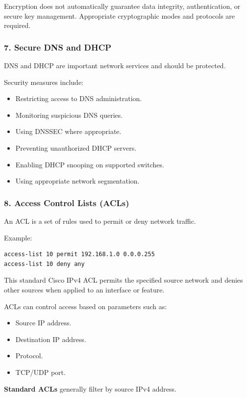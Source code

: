 Encryption does not automatically guarantee data integrity, authentication, or secure key management. Appropriate cryptographic modes and protocols are required.

\subsubsection{7. Secure DNS and DHCP}

DNS and DHCP are important network services and should be protected.

Security measures include:

\begin{itemize}
\item Restricting access to DNS administration.
\item Monitoring suspicious DNS queries.
\item Using DNSSEC where appropriate.
\item Preventing unauthorized DHCP servers.
\item Enabling DHCP snooping on supported switches.
\item Using appropriate network segmentation.
\end{itemize}

\subsubsection{8. Access Control Lists (ACLs)}

An ACL is a set of rules used to permit or deny network traffic.

Example:

\begin{lstlisting}
access-list 10 permit 192.168.1.0 0.0.0.255
access-list 10 deny any
\end{lstlisting}

This standard Cisco IPv4 ACL permits the specified source network and denies other sources when applied to an interface or feature.

ACLs can control access based on parameters such as:

\begin{itemize}
\item Source IP address.
\item Destination IP address.
\item Protocol.
\item TCP/UDP port.
\end{itemize}

\textbf{Standard ACLs} generally filter by source IPv4 address.

